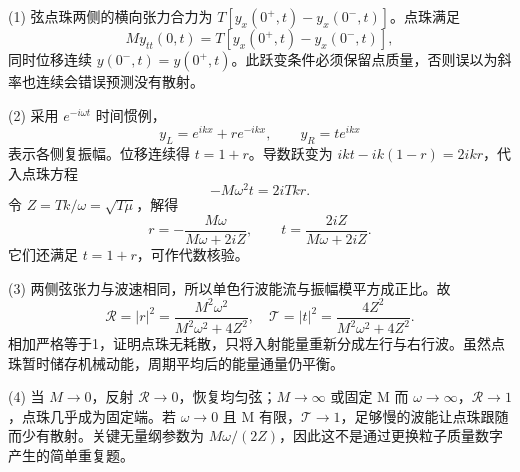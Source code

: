(1) 弦点珠两侧的横向张力合力为 \(T[y_x(0^+,t)-y_x(0^-,t)]\)。点珠满足
\[
M y_{tt}(0,t)=T[y_x(0^+,t)-y_x(0^-,t)],
\]
同时位移连续 \(y(0^-,t)=y(0^+,t)\)。此跃变条件必须保留点质量，否则误以为斜率也连续会错误预测没有散射。

(2) 采用 \(e^{-i\omega t}\) 时间惯例，
\[
y_L=e^{ikx}+re^{-ikx},\qquad y_R=te^{ikx}
\]
表示各侧复振幅。位移连续得 \(t=1+r\)。导数跃变为 \(ik t-ik(1-r)=2ikr\)，代入点珠方程
\[
-M\omega^2t=2iTk r.
\]
令 \(Z=Tk/\omega=\sqrt{T\mu}\)，解得
\[
r=-\frac{M\omega}{M\omega+2iZ},\qquad
t=\frac{2iZ}{M\omega+2iZ}.
\]
它们还满足 \(t=1+r\)，可作代数核验。

(3) 两侧弦张力与波速相同，所以单色行波能流与振幅模平方成正比。故
\[
\mathcal R=|r|^2=\frac{M^2\omega^2}{M^2\omega^2+4Z^2},\quad
\mathcal T=|t|^2=\frac{4Z^2}{M^2\omega^2+4Z^2}.
\]
相加严格等于1，证明点珠无耗散，只将入射能量重新分成左行与右行波。虽然点珠暂时储存机械动能，周期平均后的能量通量仍平衡。

(4) 当 \(M\to 0\)，反射 \(\mathcal R\to0\)，恢复均匀弦；\(M\to \infty \) 或固定 M 而 \(\omega \to \infty \)，\(\mathcal R\to1\)，点珠几乎成为固定端。若 \(\omega \to 0\) 且 M 有限，\(\mathcal T\to1\)，足够慢的波能让点珠跟随而少有散射。关键无量纲参数为 \(M\omega/(2Z)\)，因此这不是通过更换粒子质量数字产生的简单重复题。
